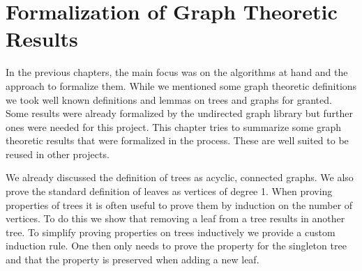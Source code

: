 \chapter{Formalization of Graph Theoretic Results}\label{chapter:isabelle_graphs}

In the previous chapters, the main focus was on the algorithms at hand and the approach to formalize them.
While we mentioned some graph theoretic definitions we took well known definitions and lemmas on trees and graphs for granted.
Some results were already formalized by the undirected graph library but further ones were needed for this project.
This chapter tries to summarize some graph theoretic results that were formalized in the process.
These are well suited to be reused in other projects.

We already discussed the definition of trees as acyclic, connected graphs.
We also prove the standard definition of leaves as vertices of degree 1.
When proving properties of trees it is often useful to prove them by induction on the number of vertices.
To do this we show that removing a leaf from a tree results in another tree.
To simplify proving properties on trees inductively we provide a custom induction rule.
One then only needs to prove the property for the singleton tree and that the property is preserved when adding a new leaf.

